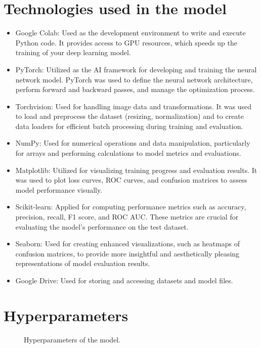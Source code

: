 \documentclass[a4paper,oneside,11pt]{book}
\begin{document}
\section{Technologies used in the model}
\begin{itemize}
    \item Google Colab: Used as the development environment to write and execute Python code. It provides access to GPU resources, which speeds up the training of your deep learning model.
    \item PyTorch: Utilized as the AI framework for developing and training the neural network model. PyTorch was used to define the neural network architecture, perform forward and backward passes, and manage the optimization process.
    \item Torchvision: Used for handling image data and transformations. It was used to load and preprocess the dataset (resizing, normalization) and to create data loaders for efficient batch processing during training and evaluation.
    \item NumPy: Used for numerical operations and data manipulation, particularly for arrays and performing calculations to model metrics and evaluations.
    \item Matplotlib: Utilized for visualizing training progress and evaluation results. It was used to plot loss curves, ROC curves, and confusion matrices to assess model performance visually.
    \item Scikit-learn: Applied for computing performance metrics such as accuracy, precision, recall, F1 score, and ROC AUC. These metrics are crucial for evaluating the model's performance on the test dataset.
    \item Seaborn: Used for creating enhanced visualizations, such as heatmaps of confusion matrices, to provide more insightful and aesthetically pleasing representations of model evaluation results.
    \item Google Drive: Used for storing and accessing datasets and model files.
\end{itemize}
\section{Hyperparameters} 
\begin{figure}[H]
    \centering
    \caption{Hyperparameters of the model.}
\end{figure}
\end{document}
